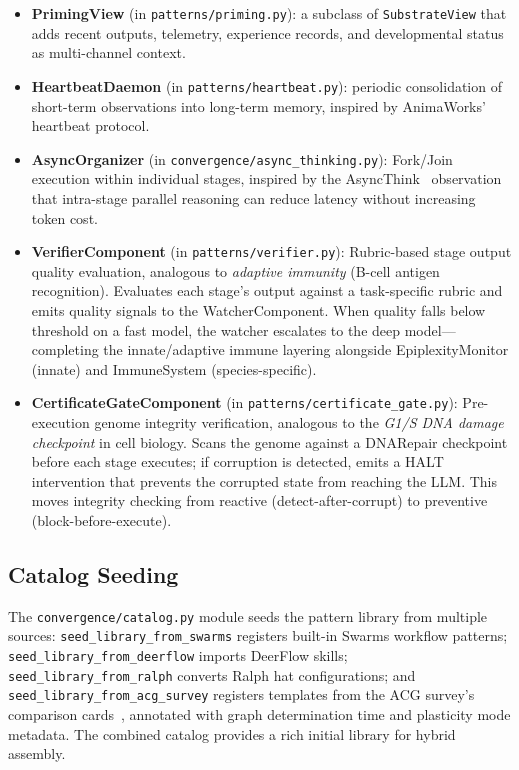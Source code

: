 \documentclass[11pt]{article}
\begin{document}
\begin{itemize}[leftmargin=*,itemsep=2pt]
  \item \textbf{PrimingView} (in \texttt{patterns/priming.py}): a subclass
    of \texttt{SubstrateView} that adds recent outputs, telemetry,
    experience records, and developmental status as multi-channel context.
  \item \textbf{HeartbeatDaemon} (in \texttt{patterns/heartbeat.py}):
    periodic consolidation of short-term observations into long-term
    memory, inspired by AnimaWorks' heartbeat protocol.
  \item \textbf{AsyncOrganizer} (in \texttt{convergence/async\_thinking.py}):
    Fork/Join execution within individual stages, inspired by the
    AsyncThink~\cite{chi2025asyncthink} observation that intra-stage
    parallel reasoning can reduce latency without increasing token cost.
  \item \textbf{VerifierComponent} (in \texttt{patterns/verifier.py}):
    Rubric-based stage output quality evaluation, analogous to
    \emph{adaptive immunity} (B-cell antigen recognition).  Evaluates
    each stage's output against a task-specific rubric and emits
    quality signals to the WatcherComponent.  When quality falls below
    threshold on a fast model, the watcher escalates to the deep model---
    completing the innate/adaptive immune layering alongside
    EpiplexityMonitor (innate) and ImmuneSystem (species-specific).
  \item \textbf{CertificateGateComponent} (in \texttt{patterns/certificate\_gate.py}):
    Pre-execution genome integrity verification, analogous to the
    \emph{G1/S DNA damage checkpoint} in cell biology.  Scans the
    genome against a DNARepair checkpoint before each stage executes;
    if corruption is detected, emits a HALT intervention that prevents
    the corrupted state from reaching the LLM.  This moves integrity
    checking from reactive (detect-after-corrupt) to preventive
    (block-before-execute).
\end{itemize}

\subsection{Catalog Seeding}

The \texttt{convergence/catalog.py} module seeds the pattern library from
multiple sources: \texttt{seed\_library\_from\_swarms} registers built-in
Swarms workflow patterns; \texttt{seed\_library\_from\_deerflow} imports
DeerFlow skills; \texttt{seed\_library\_from\_ralph} converts Ralph hat
configurations; and \texttt{seed\_library\_from\_acg\_survey} registers
templates from the ACG survey's comparison cards~\cite{yue2026acg},
annotated with graph determination time and plasticity mode metadata.
The combined catalog provides a rich initial library for hybrid assembly.
\end{document}

